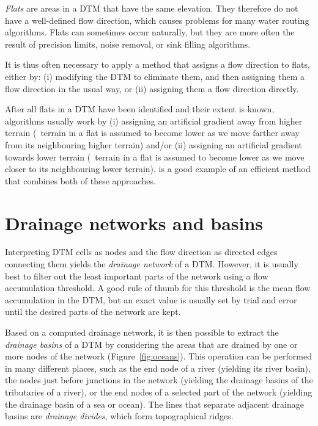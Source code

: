 \emph{Flats} are areas in a DTM that have the same elevation.
They therefore do not have a well-defined flow direction, which causes problems for many water routing algorithms.
Flats can sometimes occur naturally, but they are more often the result of precision limits, noise removal, or sink filling algorithms.

It is thus often necessary to apply a method that assigns a flow direction to flats, either by: (i) modifying the DTM to eliminate them, and then assigning them a flow direction in the usual way, or (ii) assigning them a flow direction directly.

After all flats in a DTM have been identified and their extent is known, algorithms usually work by (i) assigning an artificial gradient away from higher terrain (\ie\ terrain in a flat is assumed to become lower as we move farther away from its neighbouring higher terrain) and/or (ii) assigning an artificial gradient towards lower terrain (\ie\ terrain in a flat is assumed to become lower as we move closer to its neighbouring lower terrain).
\citet{Barnes14} is a good example of an efficient method that combines both of these approaches.

\section{Drainage networks and basins}%
\label{sec:drainage_basins}


Interpreting DTM cells as nodes and the flow direction as directed edges connecting them yields the \emph{drainage network} of a DTM\@.
However, it is usually best to filter out the least important parts of the network using a flow accumulation threshold.
A good rule of thumb for this threshold is the mean flow accumulation in the DTM, but an exact value is usually set by trial and error until the desired parts of the network are kept.

Based on a computed drainage network, it is then possible to extract the \emph{drainage basins} of a DTM by considering the areas that are drained by one or more nodes of the network (Figure~\ref{fig:oceans}).
This operation can be performed in many different places, such as the end node of a river (yielding its river basin), the nodes just before junctions in the network (yielding the drainage basins of the tributaries of a river), or the end nodes of a selected part of the network (yielding the drainage basin of a sea or ocean).
The lines that separate adjacent drainage basins are \emph{drainage divides}, which form topographical ridges.

